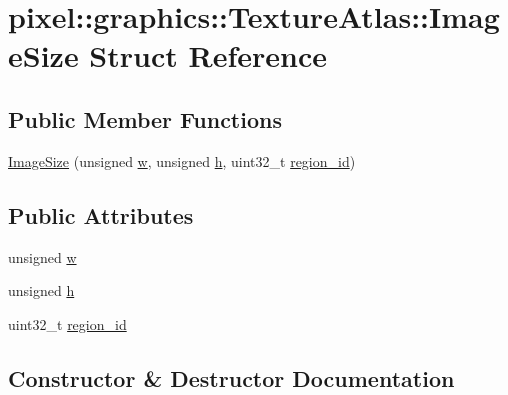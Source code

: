 \hypertarget{structpixel_1_1graphics_1_1_texture_atlas_1_1_image_size}{}\section{pixel\+:\+:graphics\+:\+:Texture\+Atlas\+:\+:Image\+Size Struct Reference}
\label{structpixel_1_1graphics_1_1_texture_atlas_1_1_image_size}
\subsection*{Public Member Functions}
\begin{DoxyCompactItemize}
\item 
\hyperlink{structpixel_1_1graphics_1_1_texture_atlas_1_1_image_size_acbe3a9c2c4e21b49b3302a0cc28866c6}{Image\+Size} (unsigned \hyperlink{structpixel_1_1graphics_1_1_texture_atlas_1_1_image_size_ab18fd4d83eff405c3cba204b1ea4ce36}{w}, unsigned \hyperlink{structpixel_1_1graphics_1_1_texture_atlas_1_1_image_size_ad098fd531e3b3f2eb376ddebd2682563}{h}, uint32\+\_\+t \hyperlink{structpixel_1_1graphics_1_1_texture_atlas_1_1_image_size_a7bd932d725ae99aedf499efe665c9be8}{region\+\_\+id})
\end{DoxyCompactItemize}
\subsection*{Public Attributes}
\begin{DoxyCompactItemize}
\item 
unsigned \hyperlink{structpixel_1_1graphics_1_1_texture_atlas_1_1_image_size_ab18fd4d83eff405c3cba204b1ea4ce36}{w}
\item 
unsigned \hyperlink{structpixel_1_1graphics_1_1_texture_atlas_1_1_image_size_ad098fd531e3b3f2eb376ddebd2682563}{h}
\item 
uint32\+\_\+t \hyperlink{structpixel_1_1graphics_1_1_texture_atlas_1_1_image_size_a7bd932d725ae99aedf499efe665c9be8}{region\+\_\+id}
\end{DoxyCompactItemize}


\subsection{Constructor \& Destructor Documentation}
\mbox{\label{structpixel_1_1graphics_1_1_texture_atlas_1_1_image_size_acbe3a9c2c4e21b49b3302a0cc28866c6}} 
